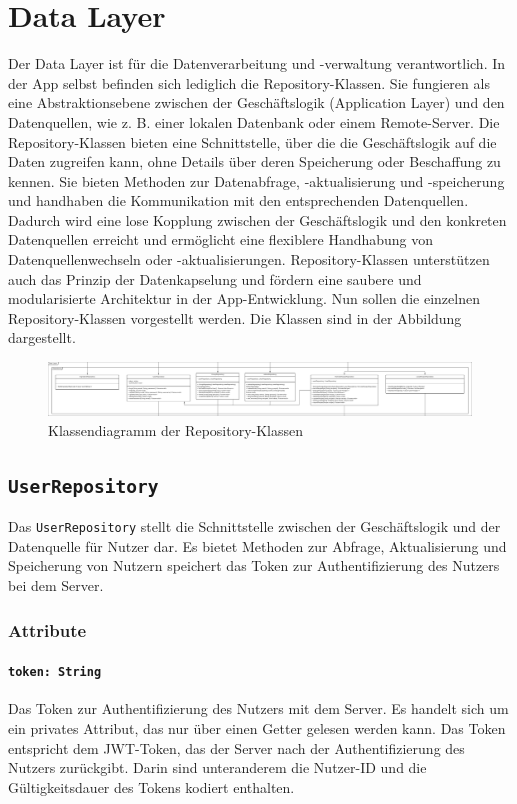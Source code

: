 \documentclass[parskip=full]{scrartcl}
\begin{document}
\newpage
\section{Data Layer}
Der Data Layer ist für die Datenverarbeitung und -verwaltung verantwortlich. In der App selbst befinden sich lediglich die Repository-Klassen. Sie fungieren als eine Abstraktionsebene zwischen der Geschäftslogik (Application Layer) und den Datenquellen, wie z. B. einer lokalen Datenbank oder einem Remote-Server. Die Repository-Klassen bieten eine Schnittstelle, über die die Geschäftslogik auf die Daten zugreifen kann, ohne Details über deren Speicherung oder Beschaffung zu kennen. Sie bieten Methoden zur Datenabfrage, -aktualisierung und -speicherung und handhaben die Kommunikation mit den entsprechenden Datenquellen. Dadurch wird eine lose Kopplung zwischen der Geschäftslogik und den konkreten Datenquellen erreicht und ermöglicht eine flexiblere Handhabung von Datenquellenwechseln oder -aktualisierungen. Repository-Klassen unterstützen auch das Prinzip der Datenkapselung und fördern eine saubere und modularisierte Architektur in der App-Entwicklung.
Nun sollen die einzelnen Repository-Klassen vorgestellt werden. Die Klassen sind in der Abbildung dargestellt.
\begin{figure}[htp]
    \centering
    \includegraphics[width=\textwidth]{images/dataLayer/dataLayer.pdf}
    \caption{Klassendiagramm der Repository-Klassen}
    \label{fig:dataLayer}
\end{figure}
\newpage
\subsection{\texttt{UserRepository}}
Das \texttt{UserRepository} stellt die Schnittstelle zwischen der Geschäftslogik und der Datenquelle für Nutzer dar. Es bietet Methoden zur Abfrage, Aktualisierung und Speicherung von Nutzern speichert das Token zur Authentifizierung des Nutzers bei dem Server.
\subsubsection*{Attribute}
\paragraph{\texttt{token: String}}
Das Token zur Authentifizierung des Nutzers mit dem Server. Es handelt sich um ein privates Attribut, das nur über einen Getter gelesen werden kann. Das Token entspricht dem JWT-Token, das der Server nach der Authentifizierung des Nutzers zurückgibt. Darin sind unteranderem die Nutzer-ID und die Gültigkeitsdauer des Tokens kodiert enthalten.
\end{document}
